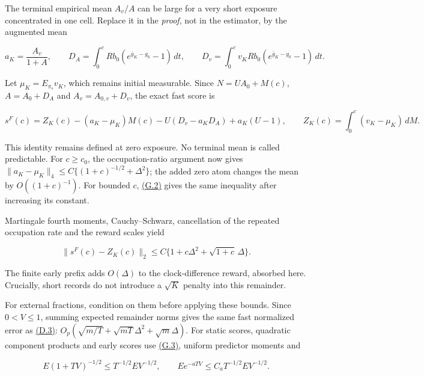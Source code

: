 \documentclass[11pt]{article}
\begin{document}
The terminal empirical mean \(A_v/A\) can be large for a very short exposure concentrated in one cell. Replace it in the \emph{proof}, not in the estimator, by the augmented mean

\begin{equation*}
a_K=\frac{A_v}{1+A},\qquad
D_A=\int_0^c Rb_0(e^{\bar g_K-g_0}-1)\,dt,\qquad
D_v=\int_0^c v_KRb_0(e^{\bar g_K-g_0}-1)\,dt .
\tag{G.4}\label{eq:G.4}
\end{equation*}

Let \(\mu_K=E_{\pi_s}v_K\), which remains initial measurable. Since
\(N=UA_0+M(c)\), \(A=A_0+D_A\) and \(A_v=A_{0,v}+D_v\), the exact fast score is

\begin{equation*}
s^F(c)=Z_K(c)-(a_K-\mu_K)M(c)
       -U(D_v-a_KD_A)+a_K(U-1),\qquad
Z_K(c)=\int_0^c(v_K-\mu_K)\,dM.
\tag{G.5}\label{eq:G.5}
\end{equation*}

This identity remains defined at zero exposure. No terminal mean is called predictable. For \(c\geq c_0\), the occupation-ratio argument now gives
\(\|a_K-\mu_K\|_4\leq C\{(1+c)^{-1/2}+\Delta^2\}\);
the added zero atom changes the mean by \(O((1+c)^{-1})\).
For bounded \(c\), \hyperref[eq:G.2]{(G.2)} gives the same inequality after increasing its constant.

Martingale fourth moments, Cauchy--Schwarz, cancellation of the repeated occupation rate and the reward scales yield

\begin{equation*}
\|s^F(c)-Z_K(c)\|_2
\leq C\{1+c\Delta^2+\sqrt{1+c}\,\Delta\}.
\tag{G.6}\label{eq:G.6}
\end{equation*}

The finite early prefix adds \(O(\Delta)\) to the clock-difference reward, absorbed here. Crucially, short records do not introduce a \(\sqrt K\) penalty into this remainder.

For external fractions, condition on them before applying these bounds. Since \(0<V\leq1\), summing expected remainder norms gives the same fast normalized error as \hyperref[eq:D.3]{(D.3)}:
\(O_p(\sqrt{m/T}+\sqrt{mT}\Delta^2+\sqrt m\Delta)\).
For static scores, quadratic component products and early scores use \hyperref[eq:G.3]{(G.3)}, uniform predictor moments and

\begin{equation*}
E(1+TV)^{-1/2}\leq T^{-1/2}EV^{-1/2},\qquad
E e^{-aTV}\leq C_aT^{-1/2}EV^{-1/2}.
\tag{G.7}\label{eq:G.7}
\end{equation*}
\end{document}
